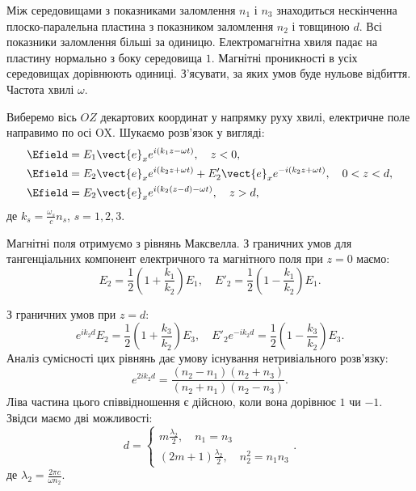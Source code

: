 \begin{problem}
    Між середовищами з показниками заломлення $n_1$  і $n_3$ знаходиться нескінченна плоско-паралельна
    пластина з показником заломлення $n_2$  і товщиною $d$. Всі показники заломлення більші за
    одиницю. Електромагнітна хвиля падає на пластину нормально з боку середовища $1$. Магнітні
    проникності в усіх середовищах дорівнюють одиниці. З’ясувати, за яких умов буде нульове відбиття.
    Частота хвилі $\omega$.
\begin{solution}
    Виберемо вісь $OZ$ декартових координат у напрямку руху хвилі, електричне поле направимо по осі
    OX. Шукаємо розв’язок у вигляді:
    \begin{align*}
        \Efield &= E_1\vect{e}_x e^{i(k_1z - \omega t)}, \quad z<0, \\
        \Efield &= E_2\vect{e}_x e^{i(k_2z + \omega t)} + E'_2\vect{e}_x e^{-i(k_2z + \omega t)},
        \quad 0<z<d, \\
        \Efield &= E_2\vect{e}_x e^{i(k_2(z-d) - \omega t)}, \quad z>d,
    \end{align*}
    де $k_s = \frac{\omega_s}{c}n_s$, $s = 1,2,3$.

    Магнітні поля отримуємо з рівнянь Максвелла. З граничних умов для тангенціальних компонент
    електричного та магнітного поля при $z = 0$ маємо:
    \[
        E_2 = \frac{1}{2}\left(1 + \frac{k_1}{k_2} \right){E_1}, \quad E'_2 = \frac{1}{2}\left( 1 -
        \frac{k_1}{k_2} \right){E_1}.
    \]

    З граничних умов при  $z = d$:
    \[
        e^{ik_2d}{E_2} = \frac{1}{2}\left( 1 + \frac{k_3}{k_2} \right)E_3, \quad E'_2e^{- ik_2d} =
        \frac{1}{2}\left( 1 - \frac{k_3}{k_2} \right)E_3.
    \]
    Аналіз сумісності цих рівнянь дає умову існування нетривіального розв’язку:
    \[
        e^{2ik_2d} = \frac{(n_2 - n_1)(n_2 + n_3)}{(n_2 + n_1)(n_2 - n_3)}.
    \]
    Ліва частина цього співвідношення є дійсною, коли вона дорівнює $1$ чи $-1$. Звідси маємо дві
    можливості:
    \begin{equation*}
    d=
    \begin{cases}
    m\frac{\lambda_2}{2}, \quad n_1 = n_3\\
    (2m+1)\frac{\lambda_2}{2}, \quad n_2^2 = n_1n_3
    \end{cases}.
    \end{equation*}
    де $\lambda_2 = \frac{2\pi c}{\omega n_2}$.
\end{solution}
\end{problem}



